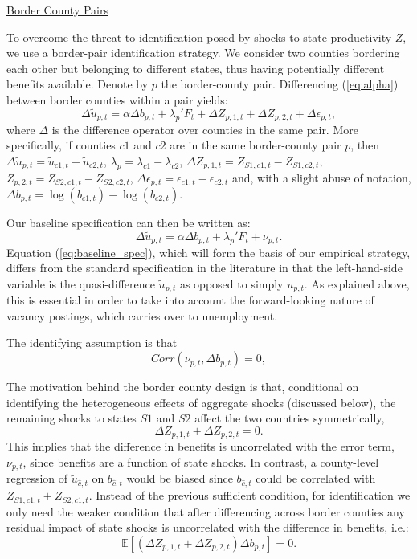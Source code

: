 \documentclass[12pt]{article}
\newcommand{\1}{\mathbf{1}}
\newcommand{\E}{\mathbb{E}}
\begin{document}
\noindent
\underline{Border County Pairs}

To overcome the threat to identification posed by shocks to state productivity $Z$, we use a border-pair identification strategy. We consider two counties bordering each other but belonging to different states, thus having potentially different benefits available. Denote by $p$ the border-county pair. Differencing (\ref{eq:alpha}) between border counties within a pair yields:
\begin{equation}
\Delta \tilde{u}_{p,t} = \alpha \Delta b_{p,t} + \lambda_{p}'F_t + \Delta {Z}_{p,1,t}+\Delta {Z}_{p,2,t}+\Delta\epsilon_{p,t},
\end{equation}
where $\Delta$ is the difference operator over counties in the same pair. More specifically, if counties $c1$ and $c2$ are in the same border-county pair $p$, then $\Delta \tilde{u}_{p,t}=\tilde{u}_{c1,t}-\tilde{u}_{c2,t}$, $\lambda_p=\lambda_{c1}-\lambda_{c2}$, $\Delta {Z}_{p,1,t}=Z_{S1,c1,t}-Z_{S1,c2,t}$, ${Z}_{p,2,t}=Z_{S2,c1,t}- Z_{S2,c2,t}$, $\Delta \epsilon_{p,t}=\epsilon_{c1,t}-\epsilon_{c2,t}$ and, with a slight abuse of notation, $\Delta b_{p,t}=\log(b_{c1,t})-\log(b_{c2,t})$. 

Our baseline specification can then be written as:
\begin{equation}
\Delta \tilde{u}_{p,t} =  \alpha \Delta b_{p,t} +\lambda_{p}'F_{t}+ \nu_{p,t}. \label{eq:baseline_spec}
\end{equation}
Equation (\ref{eq:baseline_spec}), which will form the basis of our empirical strategy, differs from the standard specification in the literature in that the left-hand-side variable is the quasi-difference $\tilde{u}_{p,t}$ as opposed to simply $u_{p,t}$. As explained above, this is essential in order to take into account the forward-looking nature of vacancy postings, which carries over to unemployment.

The identifying assumption is that
\begin{equation} \label{assu:identify_main}
Corr (\nu_{p,t}, \Delta b_{p,t}) = 0,
\end{equation}

The motivation behind the border county design is that, conditional on identifying the heterogeneous effects of aggregate shocks (discussed below), the remaining shocks to states $S1$ and $S2$ affect the two countries symmetrically,
$$
 \Delta {Z}_{p,1,t}+\Delta {Z}_{p,2,t} = 0.
$$
This implies that the difference in benefits is uncorrelated with the error term, $\nu_{p,t}$, since benefits are a function of state shocks.
In contrast, a county-level regression of $\tilde{u}_{\hat{c},t}$ on $b_{\hat{c},t}$ would be biased since $b_{\hat{c},t}$ could be correlated with $Z_{S1,c1,t}+Z_{S2,c1,t}$. Instead of the previous sufficient condition, for identification we only need the weaker condition that after differencing across border counties any residual impact of state shocks is uncorrelated with the difference in benefits, i.e.:
\begin{equation}
\E\left[ \left(\Delta {Z}_{p,1,t}+\Delta {Z}_{p,2,t}\right)  \Delta b_{p,t} \right] = 0. \label{eq:bc_identify}
\end{equation}
\end{document}
